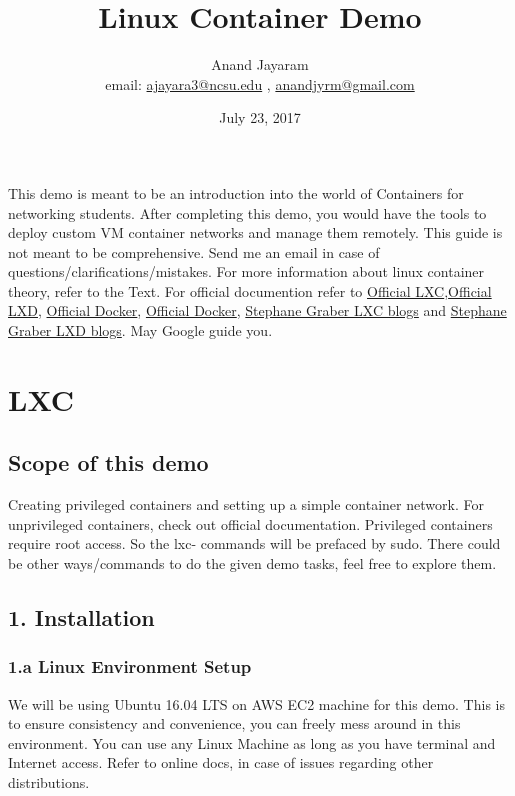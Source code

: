 \documentclass{report}
\title{Linux Container Demo}
\author{Anand Jayaram \\ email: \href{mailto:ajayara3@ncsu.edu}{ajayara3@ncsu.edu} ,  \href{mailto:anandjyrm@gmail.com}{anandjyrm@gmail.com}}
\date{July 23, 2017}
\begin{document}
\maketitle

This demo is meant to be an introduction into the world of Containers for networking students. After completing this demo, you would have the tools to deploy custom VM container networks and manage them remotely. This guide is not meant to be comprehensive. Send me an email in case of questions/clarifications/mistakes. For more information about linux container theory, refer to the Text. For official documention refer to \href{https://linuxcontainers.org/lxc/documentation/}{Official LXC},\href{https://linuxcontainers.org/lxd/}{Official LXD}, \href{https://docs.docker.com/}{Official Docker}, \href{https://docs.docker.com/}{Official Docker}, \href{https://stgraber.org/2013/12/20/lxc-1-0-blog-post-series/}{Stephane Graber LXC blogs} and \href{https://stgraber.org/2016/03/11/lxd-2-0-blog-post-series-012/}{Stephane Graber LXD blogs}. May Google guide you.




\chapter*{LXC}

\section*{Scope of this demo}

Creating privileged containers and setting up a simple container network. For unprivileged containers, check out official documentation. Privileged containers require root access. So the lxc- commands will be prefaced by sudo. There could be other ways/commands to do the given demo tasks, feel free to explore them.

\section*{1. Installation}

\subsection*{1.a Linux Environment Setup}

We will be using Ubuntu 16.04 LTS on AWS EC2 machine for this demo. This is to ensure consistency and convenience, you can freely mess around in this environment. You can use any Linux Machine as long as you have terminal and Internet access. Refer to online docs, in case of issues regarding other distributions.
\end{document}
